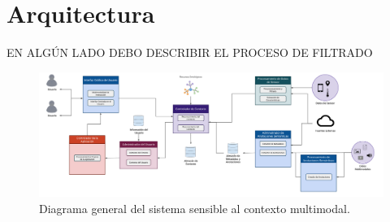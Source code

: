 \section{Arquitectura}
\label{sec:Prop_Arquitectura}


EN ALGÚN LADO DEBO DESCRIBIR EL PROCESO DE FILTRADO





\begin{figure}[ht]
\centering%
\includegraphics[width=\textwidth]{Cap3/Images/Diagrama_General}%
\caption{Diagrama general del sistema sensible al contexto multimodal.} \label{fig:Diagrama_General}
\end{figure}



